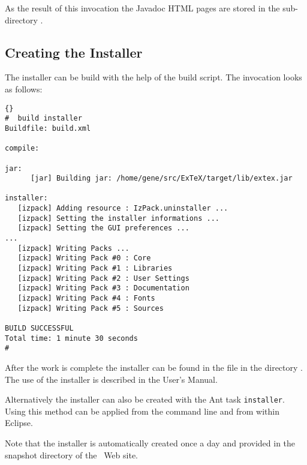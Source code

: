 As the result of this invocation the Javadoc HTML pages are stored in
the sub-directory .


\subsection{Creating the Installer}\label{sec:shell-installer}

The installer can be build with the help of the build script. The
invocation looks as follows:

\begin{lstlisting}{}
#  build installer
Buildfile: build.xml

compile:

jar:
      [jar] Building jar: /home/gene/src/ExTeX/target/lib/extex.jar

installer:
   [izpack] Adding resource : IzPack.uninstaller ...
   [izpack] Setting the installer informations ...
   [izpack] Setting the GUI preferences ...
... 
   [izpack] Writing Packs ...
   [izpack] Writing Pack #0 : Core
   [izpack] Writing Pack #1 : Libraries
   [izpack] Writing Pack #2 : User Settings
   [izpack] Writing Pack #3 : Documentation
   [izpack] Writing Pack #4 : Fonts
   [izpack] Writing Pack #5 : Sources

BUILD SUCCESSFUL
Total time: 1 minute 30 seconds
#
\end{lstlisting}{}

After the work is complete the installer can be found in the file
 in the directory . The use of the
installer is described in the User's Manual.

Alternatively the installer can also be created with the Ant task
\texttt{installer}. Using this method can be applied from the command
line and from within Eclipse.

Note that the installer is automatically created once a day and
provided in the snapshot directory of the \ExTeX\ Web site.

